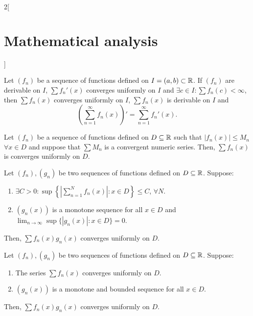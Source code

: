 \documentclass[../../../main.tex]{subfiles}
\begin{document}
\begin{multicols}{2}[\section{Mathematical analysis}]
\begin{theorem}
Let $(f_n)$ be a sequence of functions defined on $I=(a,b)\subset\mathbb{R} $. If $(f_n)$ are derivable on $I$, $\sum f_n'(x)$ converges uniformly on $I$ and $\exists c\in I:\sum f_n(c)<\infty$, then $\sum f_n(x)$ converges uniformly on $I$, $\sum f_n(x)$ is derivable on $I$ and $$\left(\sum_{n=1}^\infty f_n(x)\right)'=\sum_{n=1}^\infty f_n'(x).$$
\end{theorem}
\begin{theorem}
Let $(f_n)$ be a sequence of functions defined on $D\subseteq\mathbb{R} $ such that $|f_n(x)|\leq M_n$ $\forall x\in D$ and suppose that $\sum M_n$ is a convergent numeric series. Then, $\sum f_n(x)$ is converges uniformly on $D$.
\end{theorem}
\begin{theorem}
Let $(f_n),(g_n)$ be two sequences of functions defined on $D\subseteq\mathbb{R} $. Suppose:
\begin{enumerate}
    \item $\displaystyle\exists C>0: \sup\left\{\left|\sum_{n=1}^Nf_n(x)\right|:x\in D\right\}\leq C$, $\forall N$.
    \item $(g_n(x))$ is a monotone sequence for all $x\in D$ and $\displaystyle\lim_{n\to\infty}\sup\{|g_n(x)|:x\in D\}=0$.
\end{enumerate}
Then, $\sum f_n(x)g_n(x)$ converges uniformly on $D$.
\end{theorem}
\begin{theorem}
Let $(f_n),(g_n)$ be two sequences of functions defined on $D\subseteq\mathbb{R} $. Suppose:
\begin{enumerate}
    \item The series $\sum f_n(x)$ converges uniformly on $D$.
    \item $(g_n(x))$ is a monotone and bounded sequence for all $x\in D$.
\end{enumerate}
Then, $\sum f_n(x)g_n(x)$ converges uniformly on $D$.
\end{theorem}

\end{multicols}
\end{document}
